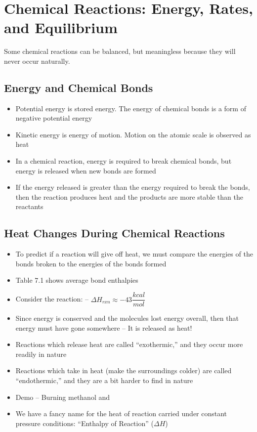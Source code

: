 \documentclass[12pt, openany, letterpaper]{memoir}
\begin{document}
\chapter{Chemical Reactions: Energy, Rates, and Equilibrium}
Some chemical reactions can be balanced, but meaningless because they will never occur naturally.



\section{Energy and Chemical Bonds}
\begin{itemize}
	\item Potential energy is stored energy. The energy of chemical bonds is a form of negative potential energy
	\item Kinetic energy is energy of motion. Motion on the atomic scale is observed as heat
	\item In a chemical reaction, energy is required to break chemical bonds, but energy is released when new bonds are formed
	\item If the energy released is greater than the energy required to break the bonds, then the reaction produces heat and the products are more stable than the reactants
\end{itemize}

\section{Heat Changes During Chemical Reactions}
\begin{itemize}
	\item To predict if a reaction will give off heat, we must compare the energies of the bonds broken to the energies of the bonds formed
	\item Table 7.1 shows average bond enthalpies
	\item Consider the reaction:  -- $\Delta H_{rxn}\approx-43\dfrac{kcal}{mol}$
	\item Since energy is conserved and the molecules lost energy overall, then that energy must have gone somewhere -- It is released as heat!
	\item Reactions which release heat are called ``exothermic,'' and they occur more readily in nature
	\item Reactions which take in heat (make the surroundings colder) are called ``endothermic,'' and they are a bit harder to find in nature
	\item Demo -- Burning methanol and 
	\item We have a fancy name for the heat of reaction carried under constant pressure conditions: ``Enthalpy of Reaction'' ($\Delta H$)
\end{itemize}
\end{document}
